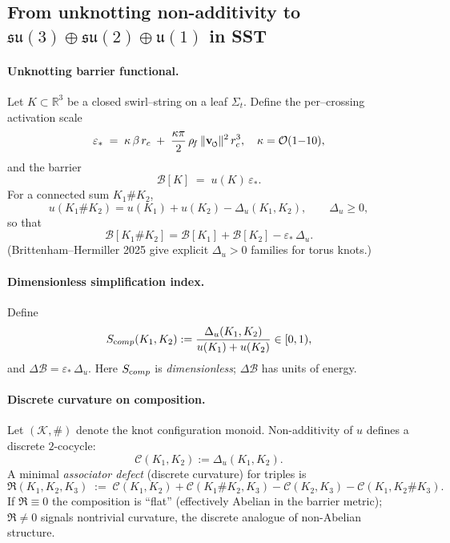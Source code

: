 \documentclass[11pt]{article}
\begin{document}
\subsection*{From unknotting non-additivity to \(\mathfrak{su}(3)\oplus\mathfrak{su}(2)\oplus\mathfrak u(1)\) in SST}

\paragraph{Unknotting barrier functional.}
    Let \(K\subset\mathbb R^3\) be a closed swirl–string on a leaf \(\Sigma_t\).
    Define the per–crossing activation scale
    \[
        \varepsilon_*\;=\;\kappa\,\beta\,\rc\;+\;\frac{\kappa\pi}{2}\,\rhof\,\vnorm^2\,\rc^3,
        \quad \kappa=\mathcal O(1{-}10),
    \]
    and the barrier
    \[
        \mathcal B[K]\;=\;u(K)\,\varepsilon_*.
    \]
    For a connected sum \(K_1\#K_2\),
    \[
        u(K_1\#K_2)=u(K_1)+u(K_2)-\Delta_u(K_1,K_2),\qquad \Delta_u\ge 0,
    \]
    so that
    \[
        \mathcal B[K_1\#K_2]=\mathcal B[K_1]+\mathcal B[K_2]-\varepsilon_*\,\Delta_u.
    \]
    (Brittenham–Hermiller 2025 give explicit \(\Delta_u>0\) families for torus knots.)

\paragraph{Dimensionless simplification index.}
    Define
    \[
        S_{\textrm comp}(K_1,K_2):=\frac{\Delta_u(K_1,K_2)}{u(K_1)+u(K_2)}\in[0,1),
    \]
    and \(\Delta\mathcal B=\varepsilon_*\,\Delta_u\). Here \(S_{\textrm comp}\) is \emph{dimensionless}; \(\Delta\mathcal B\) has units of energy.

\paragraph{Discrete curvature on composition.}
    Let \((\mathcal K,\#)\) denote the knot configuration monoid. Non-additivity of \(u\) defines a discrete \(2\)-cocycle:
    \[
        \mathcal C(K_1,K_2):=\Delta_u(K_1,K_2).
    \]
    A minimal \emph{associator defect} (discrete curvature) for triples is
    \[
        \mathfrak{R}(K_1,K_2,K_3)\;:=\;
        \mathcal C(K_1,K_2)+\mathcal C(K_1\#K_2,K_3)
        -\mathcal C(K_2,K_3)-\mathcal C(K_1,K_2\#K_3).
    \]
    If \(\mathfrak{R}\equiv 0\) the composition is “flat” (effectively Abelian in the barrier metric); \(\mathfrak{R}\neq 0\) signals nontrivial curvature, the discrete analogue of non-Abelian structure.
\end{document}
